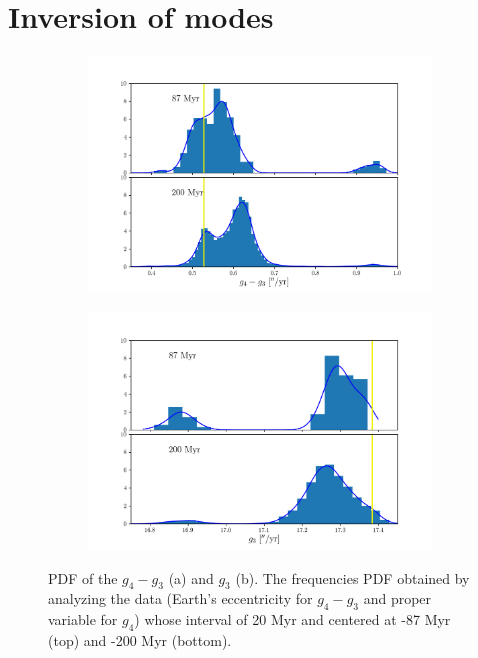 \documentclass[12pt]{article}
\begin{document}
	\section{Inversion of modes} \label{sec:inv}
	\begin{figure}[t!]
		\centering
		\begin{subfigure}[t]{0.50\textwidth}
			\centering
			\includegraphics[width=1.0\textwidth,height=0.25\textheight]{figures/PDF_g4g3}%
			\caption{}
			\label{fig:inver_PDFa}
		\end{subfigure}%
		\begin{subfigure}[t]{0.50\textwidth}
			\centering
			\includegraphics[width=1.0\textwidth,height=0.25\textheight]{figures/PDF_g3_time_big_bin15_50}%
			\caption{}
			\label{fig:inver_PDFb}
		\end{subfigure}
		\caption{PDF of the $g_4-g_3$ (a) and $g_3$ (b). The frequencies PDF obtained by analyzing the data (Earth's eccentricity for $g_4 - g_3$ and proper variable for $g_4$) whose interval of 20 Myr and centered at -87 Myr (top) and -200 Myr (bottom).}
		\label{fig:inver_PDF}
	\end{figure}
\end{document}
